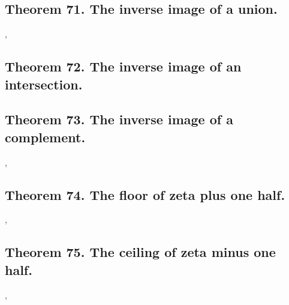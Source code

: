 \documentclass[preview]{standalone}
\begin{document}
\subsection[The inverse image of a union under lambda.]
    {
        \color{section}Theorem 71. \color{black} The inverse image of a union.
    }

\sep


\subsection[The inverse image of an intersection under lambda.]
    {
        \color{section}Theorem 72. \color{black} The inverse image of an intersection.
    }

\pagebreak


\subsection[The inverse image of a complement under lambda.]
    {
        \color{section}Theorem 73. \color{black} The inverse image of a complement.
    }

\sep
\pagebreak


\subsection[The floor of zeta plus one half.]
    {
        \color{section}Theorem 74. \color{black} The floor of zeta plus one half.
    }

\sep
\pagebreak


\subsection[The ceiling of zeta minus one half.]
    {
        \color{section}Theorem 75. \color{black} The ceiling of zeta minus one half.
    }

\sep
\pagebreak


\end{document}
